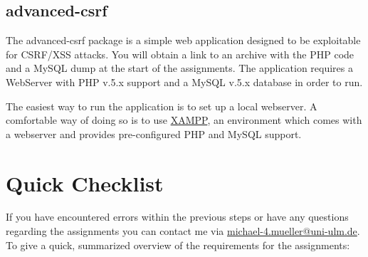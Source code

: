 \documentclass{report}
\begin{document}
\subsection{advanced-csrf}
The advanced-csrf package is a simple web application designed
to be exploitable for CSRF/XSS attacks. 
You will obtain a link to an archive with the PHP code and a MySQL dump
at the start of the assignments. The application requires a WebServer with 
PHP v.5.x support and a MySQL v.5.x database in order to run.

The easiest way to run the application is to set up a local webserver. A 
comfortable way of doing so is to use 
\href{https://www.apachefriends.org/index.html}{XAMPP}, an
environment which comes with a webserver and provides pre-configured PHP 
and MySQL support.



\section{Quick Checklist}

If you have encountered errors within the previous steps or have any questions
regarding the assignments you can contact me via
\href{mailto:michael-4.mueller@uni-ulm.de}{michael-4.mueller@uni-ulm.de}. 
To give a quick, summarized overview of the requirements for the assignments:

\end{document}
